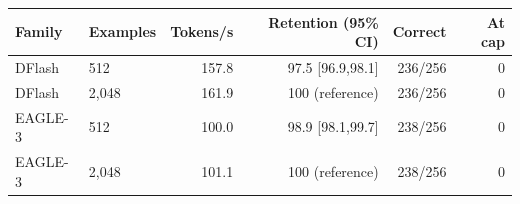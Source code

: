 \begin{tabular}{llrrrr}
\toprule
Family & Examples & Tokens/s & Retention (95\% CI) & Correct & At cap \\
\midrule
DFlash & 512 & 157.8 & 97.5 [96.9,98.1] & 236/256 & 0 \\
DFlash & 2,048 & 161.9 & 100 (reference) & 236/256 & 0 \\
EAGLE-3 & 512 & 100.0 & 98.9 [98.1,99.7] & 238/256 & 0 \\
EAGLE-3 & 2,048 & 101.1 & 100 (reference) & 238/256 & 0 \\
\bottomrule
\end{tabular}
